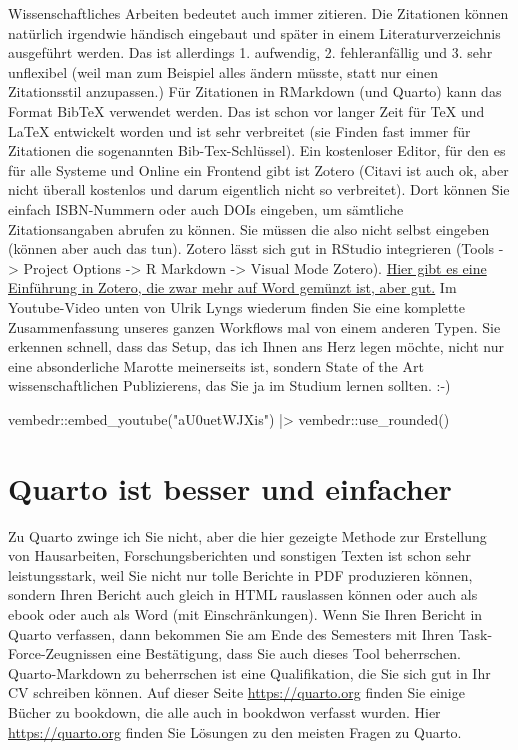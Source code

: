 \documentclass[twoside, pagesize, fontsize=11pt, dvipsnames]{scrreport}
\newenvironment{Shaded}{\begin{snugshade}}{\end{snugshade}}
\newcommand{\FunctionTok}[1]{\textcolor[rgb]{0.28,0.35,0.67}{#1}}
\newcommand{\NormalTok}[1]{\textcolor[rgb]{0.00,0.23,0.31}{#1}}
\newcommand{\SpecialCharTok}[1]{\textcolor[rgb]{0.37,0.37,0.37}{#1}}
\newcommand{\StringTok}[1]{\textcolor[rgb]{0.13,0.47,0.30}{#1}}
\begin{document}
Wissenschaftliches Arbeiten bedeutet auch immer zitieren. Die Zitationen
können natürlich irgendwie händisch eingebaut und später in einem
Literaturverzeichnis ausgeführt werden. Das ist allerdings 1. aufwendig,
2. fehleranfällig und 3. sehr unflexibel (weil man zum Beispiel alles
ändern müsste, statt nur einen Zitationsstil anzupassen.) Für Zitationen
in RMarkdown (und Quarto) kann das Format BibTeX verwendet werden. Das
ist schon vor langer Zeit für TeX und LaTeX entwickelt worden und ist
sehr verbreitet (sie Finden fast immer für Zitationen die sogenannten
Bib-Tex-Schlüssel). Ein kostenloser Editor, für den es für alle Systeme
und Online ein Frontend gibt ist Zotero (Citavi ist auch ok, aber nicht
überall kostenlos und darum eigentlich nicht so verbreitet). Dort können
Sie einfach ISBN-Nummern oder auch DOIs eingeben, um sämtliche
Zitationsangaben abrufen zu können. Sie müssen die also nicht selbst
eingeben (können aber auch das tun). Zotero lässt sich gut in RStudio
integrieren (Tools -\textgreater{} Project Options -\textgreater{} R
Markdown -\textgreater{} Visual Mode Zotero).
\href{https://www.youtube.com/watch?v=PqQp_oUUY5w}{Hier gibt es eine
Einführung in Zotero, die zwar mehr auf Word gemünzt ist, aber gut.} Im
Youtube-Video unten von Ulrik Lyngs wiederum finden Sie eine komplette
Zusammenfassung unseres ganzen Workflows mal von einem anderen Typen.
Sie erkennen schnell, dass das Setup, das ich Ihnen ans Herz legen
möchte, nicht nur eine absonderliche Marotte meinerseits ist, sondern
State of the Art wissenschaftlichen Publizierens, das Sie ja im Studium
lernen sollten. :-)

\begin{Shaded}
\begin{Highlighting}[]
\NormalTok{vembedr}\SpecialCharTok{::}\FunctionTok{embed\_youtube}\NormalTok{(}\StringTok{"aU0uetWJXis"}\NormalTok{) }\SpecialCharTok{|\textgreater{}} 
\NormalTok{  vembedr}\SpecialCharTok{::}\FunctionTok{use\_rounded}\NormalTok{()}
\end{Highlighting}
\end{Shaded}

\hypertarget{quarto-ist-besser-und-einfacher}{%
\section{Quarto ist besser und
einfacher}\label{quarto-ist-besser-und-einfacher}}

Zu Quarto zwinge ich Sie nicht, aber die hier gezeigte Methode zur
Erstellung von Hausarbeiten, Forschungsberichten und sonstigen Texten
ist schon sehr leistungsstark, weil Sie nicht nur tolle Berichte in PDF
produzieren können, sondern Ihren Bericht auch gleich in HTML rauslassen
können oder auch als ebook oder auch als Word (mit Einschränkungen).
Wenn Sie Ihren Bericht in Quarto verfassen, dann bekommen Sie am Ende
des Semesters mit Ihren Task-Force-Zeugnissen eine Bestätigung, dass Sie
auch dieses Tool beherrschen. Quarto-Markdown zu beherrschen ist eine
Qualifikation, die Sie sich gut in Ihr CV schreiben können. Auf dieser
Seite \url{https://quarto.org} finden Sie einige Bücher zu bookdown, die
alle auch in bookdwon verfasst wurden. Hier \url{https://quarto.org}
finden Sie Lösungen zu den meisten Fragen zu Quarto.
\end{document}
